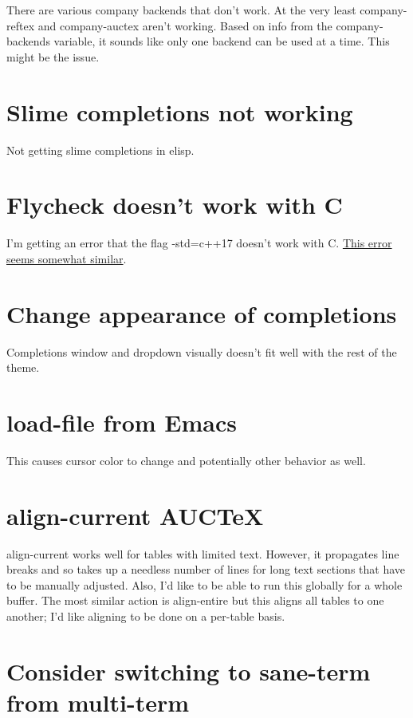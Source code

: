 \documentclass{default}
\begin{document}
There are various company backends that don't work. At the very least company-reftex and
company-auctex aren't working. Based on info from the company-backends variable, it sounds like only
one backend can be used at a time. This might be the issue.

\section{Slime completions not working}

Not getting slime completions in elisp.

\section{Flycheck doesn't work with C}

I'm getting an error that the flag -std=c++17 doesn't work with
C\@. \href{https://github.com/alexmurray/flycheck-clang-analyzer/issues/6}{This error seems somewhat
similar}.

\section{Change appearance of completions}

Completions window and dropdown visually doesn't fit well with the rest of the theme.

\section{load-file from Emacs}

This causes cursor color to change and potentially other behavior as well.

\section{align-current AUCTeX}

align-current works well for tables with limited text. However, it propagates line breaks and so
takes up a needless number of lines for long text sections that have to be manually adjusted. Also,
I'd like to be able to run this globally for a whole buffer. The most similar action is align-entire
but this aligns all tables to one another; I'd like aligning to be done on a per-table basis.

\section{Consider switching to sane-term from multi-term}
\end{document}
